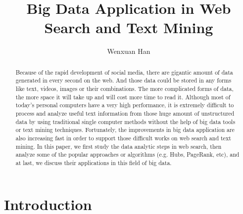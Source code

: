 \documentclass[sigconf]{acmart}
\begin{document}
\title{Big Data Application in Web Search and Text Mining}


\author{Wenxuan Han}



\begin{abstract}
Because of the rapid development of social media, there are gigantic amount of data generated in every second on the web. And those data could be stored in any forms like text, videos, images or their combinations. The more complicated forms of data, the more space it will take up and will cost more time to read it. Although most of today's personal computers have a very high performance, it is extremely difficult to process and analyze useful text information from those huge amount of unstructured data by using traditional single computer methods without the help of big data tools or text mining techniques. Fortunately, the improvements in big data application are also increasing fast in order to support those difficult works on web search and text mining. In this paper, we first study the data analytic steps in web search, then analyze some of the popular approaches or algorithms (e.g. Hubs, PageRank, etc), and at last, we discuss their applications in this field of big data.
\end{abstract}



\maketitle

\section{Introduction}
\end{document}
